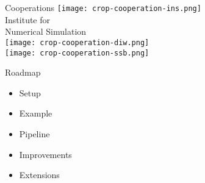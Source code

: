   \begin{frame}{Cooperations}
  	\centering   \vspace{0.25cm}
  	\texttt{[image: crop-cooperation-ins.png]} \\\vspace{-0.5cm}
  	\footnotesize{Institute for \\ Numerical Simulation}\vspace{0.3cm}   \\ \vspace{0.8cm}
  	\texttt{[image: crop-cooperation-diw.png]} \\ \vspace{0.35cm}
  	\texttt{[image: crop-cooperation-ssb.png]}
%
%
%
\end{frame}
\begin{frame}{Roadmap}\vspace{0.25cm}

  \begin{itemize}\setlength\itemsep{1em}
\item Setup
\item Example
\item Pipeline
\item Improvements
\item Extensions
\end{itemize}
\end{frame}
